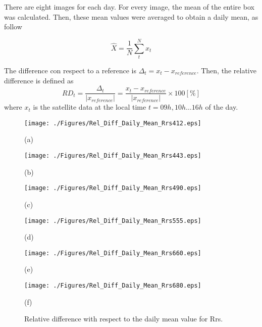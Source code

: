 \documentclass[onecolumn,3p,letterpaper,11pt]{elsarticle}
\begin{document}
There are eight images for each day. For every image, the mean of the entire box was calculated. Then, these mean values were averaged to obtain a daily mean, as follow

\begin{equation}
	\hat{X} = \frac{1}{N} \sum_{t}^N x_t
\end{equation}

The difference con respect to a reference is $\Delta_t=x_t-x_{reference}$. Then, the relative difference is defined as
\begin{equation}
	RD_t = \frac{\Delta_t}{|x_{reference}|} = \frac{x_t-x_{reference}}{|x_{reference}|}
	\times 100[\%]
\end{equation}
where $x_t$ is the satellite data at the local time $t=09h,10h\dots16h$ of the day.



\begin{figure}[htb!]
    \begin{minipage}[c]{0.48\linewidth}
      \centering
      \texttt{[image: ./Figures/Rel\_Diff\_Daily\_Mean\_Rrs412.eps]}
    \centerline{(a)}\medskip
    \end{minipage}  
    \hfill
    \begin{minipage}[c]{0.48\linewidth}
      \centering
      \texttt{[image: ./Figures/Rel\_Diff\_Daily\_Mean\_Rrs443.eps]}
      \centerline{(b)}\medskip
    \end{minipage}  

  \begin{minipage}[c]{0.48\linewidth}
      \centering
      \texttt{[image: ./Figures/Rel\_Diff\_Daily\_Mean\_Rrs490.eps]}
    \centerline{(c)}\medskip
    \end{minipage}  
    \hfill
    \begin{minipage}[c]{0.48\linewidth}
      \centering
      \texttt{[image: ./Figures/Rel\_Diff\_Daily\_Mean\_Rrs555.eps]}
      \centerline{(d)}\medskip
    \end{minipage}  

  \begin{minipage}[c]{0.48\linewidth}
      \centering
      \texttt{[image: ./Figures/Rel\_Diff\_Daily\_Mean\_Rrs660.eps]}
      \centerline{(e)}\medskip
    \end{minipage}   
        \hfill
    \begin{minipage}[c]{0.48\linewidth}
      \centering
      \texttt{[image: ./Figures/Rel\_Diff\_Daily\_Mean\_Rrs680.eps]}
      \centerline{(f)}\medskip
    \end{minipage} 
    \caption{Relative difference with respect to the daily mean value for Rrs. \label{fig:DiffDailyMeanRrs} } 
\end{figure}
\end{document}

